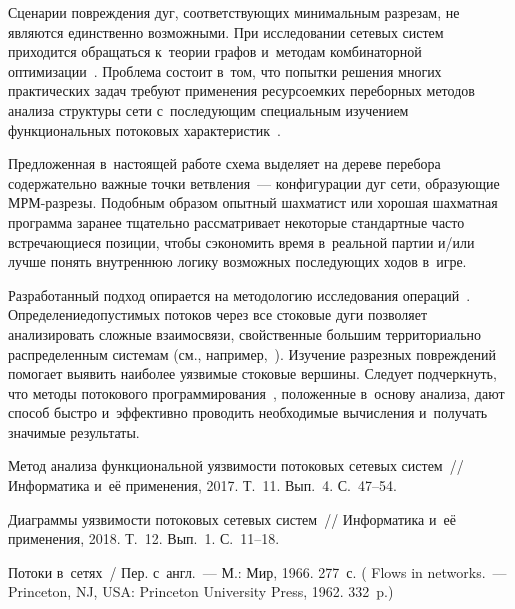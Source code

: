 \begin{multicols}{2}
Сценарии повреждения дуг, соответствующих минимальным разрезам, не являются 
единственно возможными. При исследовании сетевых систем приходится обращаться к~теории 
графов и~методам комбинаторной оптимизации~\cite{Sigal, Harari}. Проблема 
состоит в~том, что попытки решения многих практических задач требуют применения 
ресурсоемких переборных методов анализа структуры сети с~последующим специальным 
изучением функциональных потоковых  характеристик~\cite{Mur13, ros}. 

Предложенная 
в~настоящей работе схема выделяет на дереве перебора содержательно важные 
точки ветвления~--- конфигурации дуг сети, образующие МРМ-раз\-ре\-зы. 
Подобным образом опытный шахматист или хорошая шахматная программа заранее 
тщательно рассматривает некоторые стандартные часто встречающиеся позиции, 
чтобы сэкономить время в~реальной партии и/или лучше понять внутреннюю логику 
возможных последующих ходов в~игре. 

Разработанный подход опирается на мето\-до\-логию 
исследования операций~\cite{germ}. Определение\linebreak допустимых потоков через все 
стоковые дуги позволяет анализировать сложные взаимосвязи, свойственные большим 
территориально распределенным сис\-те\-мам (см., например,~\cite{Koz17}). 
Изучение разрезных по\-вреж\-де\-ний помогает выявить наиболее уязвимые стоковые вершины. 
Следует подчеркнуть, что методы потокового программирования~\cite{ford}, положенные 
в~основу анализа, дают способ быст\-ро и~эффективно проводить необходимые 
вычисления и~получать значимые  результаты. 

\vspace*{-4pt}

{\small\frenchspacing
 {%
 \begin{thebibliography}{99}
 
\vspace*{-2pt}
    
Метод анализа функциональной уязвимости потоковых сетевых систем~// 
Информатика и~её применения, 2017. Т.~11. Вып.~4. С.~47--54.
\pagebreak

Диаграммы уязвимости потоковых сетевых систем~// Информатика и~её применения, 2018. 
Т.~12. Вып.~1. С.~11--18.

 Потоки в~сетях~/ Пер. с~англ.~--- 
М.: Мир, 1966. 277~с. ( Flows in networks.~--- 
Princeton, NJ, USA: Princeton University Press, 1962. 332~p.)


\end{thebibliography}}}
\end{multicols}

